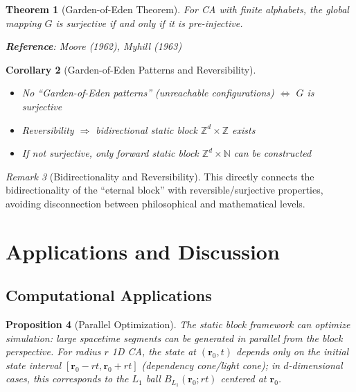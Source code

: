 \documentclass[11pt]{article}
\newtheorem{theorem}{Theorem}[section]
\newtheorem{proposition}[theorem]{Proposition}
\newtheorem{corollary}[theorem]{Corollary}
\theoremstyle{definition}
\theoremstyle{remark}
\newtheorem{remark}[theorem]{Remark}
\begin{document}
\begin{theorem}[Garden-of-Eden Theorem]\label{thm:garden}
For CA with finite alphabets, the global mapping \( G \) is surjective if and only if it is pre-injective.

\textbf{Reference}: Moore (1962), Myhill (1963)
\end{theorem}

\begin{corollary}[Garden-of-Eden Patterns and Reversibility]\label{cor:garden}
\begin{itemize}
\item No ``Garden-of-Eden patterns'' (unreachable configurations) \( \Leftrightarrow \) \( G \) is surjective
\item Reversibility \( \Rightarrow \) bidirectional static block \( \mathbb{Z}^d \times \mathbb{Z} \) exists
\item If not surjective, only forward static block \( \mathbb{Z}^d \times \mathbb{N} \) can be constructed
\end{itemize}
\end{corollary}

\begin{remark}[Bidirectionality and Reversibility]
This directly connects the bidirectionality of the ``eternal block'' with reversible/surjective properties, avoiding disconnection between philosophical and mathematical levels.
\end{remark}

\section{Applications and Discussion}\label{sec:applications}

\subsection{Computational Applications}

\begin{proposition}[Parallel Optimization]\label{prop:parallel}
The static block framework can optimize simulation: large spacetime segments can be generated in parallel from the block perspective. For radius \( r \) 1D CA, the state at \( (\mathbf{r}_0, t) \) depends only on the initial state interval \( [\mathbf{r}_0 - rt, \mathbf{r}_0 + rt] \) (dependency cone/light cone); in \( d \)-dimensional cases, this corresponds to the \( L_1 \) ball \( B_{L_1}(\mathbf{r}_0; rt) \) centered at \( \mathbf{r}_0 \).
\end{proposition}
\end{document}
